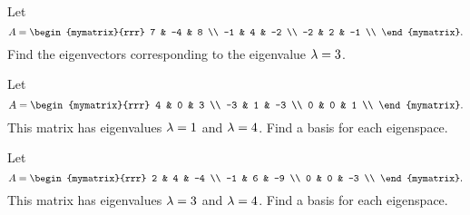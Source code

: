 \begin{enumialphparenastyle}
\begin{ex}
  Let
  \begin{equation*}
    A = \begin{mymatrix}{rrr}
      7 &  -4 &   8 \\
      -1 &  4 &  -2 \\
      -2 &  2 &  -1 \\
    \end{mymatrix}.
  \end{equation*}
  Find the eigenvectors corresponding to the eigenvalue $\lambda=3$.
\end{ex}

\begin{ex}
  Let
  \begin{equation*}
    A = \begin{mymatrix}{rrr}
      4 &   0 &   3 \\
      -3 &   1 &  -3 \\
      0 &   0 &   1 \\
    \end{mymatrix}.
  \end{equation*}
  This matrix has eigenvalues $\lambda=1$ and $\lambda=4$. Find a
  basis for each eigenspace.
\end{ex}

\begin{ex}
  Let
  \begin{equation*}
    A = \begin{mymatrix}{rrr}
      2 &   4 &  -4 \\
      -1 &  6 &  -9 \\
      0 &   0 &  -3 \\
    \end{mymatrix}.
  \end{equation*}
  This matrix has eigenvalues $\lambda=3$ and $\lambda=4$. Find a
  basis for each eigenspace.
\end{ex}


\end{enumialphparenastyle}
